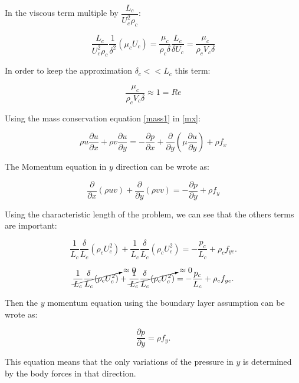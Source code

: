 In the viscous term multiple by $\dfrac{L_c}{U_c^2\rho_c}$:

\begin{equation} 
\frac{L_c}{U_c^2\rho_c}
\frac{1}{\delta^2}(\mu_c U_c)=
\frac{\mu_c }{\rho_c\delta}
\frac{L_c}{\delta U_c}=
\frac{\mu_c }{\rho_cV_c\delta}
\end{equation} 

In order to keep the approximation $\delta_c<<L_c$
this term:

\begin{equation} 
\frac{\mu_c }{\rho_cV_c\delta}\approx1=Re
\end{equation} 

Using the mass conservation equation \ref{mass1} in \ref{mx}: 

\begin{equation} 
\rho u\frac{\partial u}{\partial x}+
\rho v\frac{\partial u}{\partial y}=-
\frac{\partial p}{\partial x}+
\frac{\partial}{\partial y}\left(\mu\frac{\partial u}{\partial y}\right)+
\rho f_x
\end{equation} 

The Momentum equation in $y$ direction can be wrote as:

\begin{equation} 
\frac{\partial}{\partial x}(\rho uv)+
\frac{\partial}{\partial y}(\rho vv)=-
\frac{\partial p}{\partial y}+
\rho f_y
\end{equation} 

Using the characteristic length of the problem, we can see that 
the others terms are important:

\begin{equation} 
\frac{1}{L_c}\frac{\delta}{L_c}(\rho_c U_c^2)+
\frac{1}{L_c}\frac{\delta}{L_c}(\rho_c U_c^2)=
-\frac{p_c}{L_c}+
\rho_c f_{yc}.
\end{equation} 

\begin{equation} 
\cancelto{\approx0}{\frac{1}{L_c}\frac{\delta}{L_c}(\rho_c U_c^2)}+
\cancelto{\approx0}{\frac{1}{L_c}\frac{\delta}{L_c}(\rho_c U_c^2)}=
-\frac{p_c}{L_c}+
\rho_c f_{yc}.
\end{equation} 

Then the $y$ momentum equation using the boundary layer assumption can be wrote as:

\begin{equation} 
\frac{\partial p}{\partial y}=
\rho f_y.
\end{equation} 

This equation means that the only variations of the pressure in $y$ is determined 
by the body forces in that direction.

